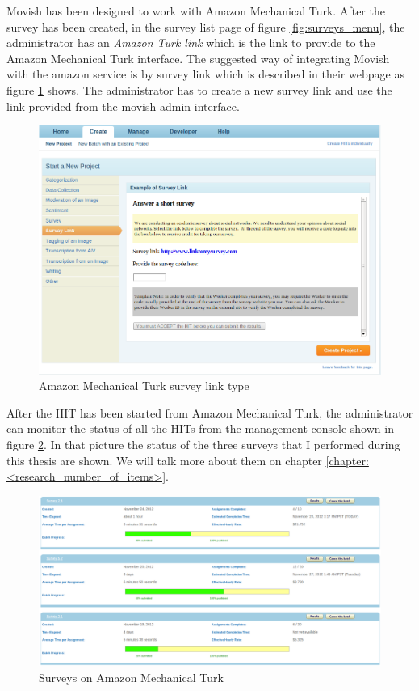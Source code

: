 Movish has been designed to work with Amazon Mechanical Turk. After the survey has been created, in the survey list page of figure \ref{fig:surveys_menu}, the administrator has an \textit{Amazon Turk link} which is the link to provide to the Amazon Mechanical Turk interface. The suggested way of integrating Movish with the amazon service is by survey link which is described in their webpage as figure \ref{fig:amazon_turk_survey_link} shows. The administrator has to create a new survey link and use the link provided from the movish admin interface.

\begin{figure}
  \centering
  \includegraphics[width=\textwidth]{figures/amazon_turk_survey_link.png}
  \caption{Amazon Mechanical Turk survey link type}
  \label{fig:amazon_turk_survey_link}
\end{figure}

After the HIT has been started from Amazon Mechanical Turk, the administrator can monitor the status of all the HITs from the management console shown in figure \ref{fig:surveys_on_turk}. In that picture the status of the three surveys that I performed during this thesis are shown. We will talk more about them on chapter \ref{chapter:<research_number_of_items>}.
 
\begin{figure}
  \centering
  \includegraphics[width=\textwidth]{figures/amazon_turk_surveys.png}
  \caption{Surveys on Amazon Mechanical Turk}
  \label{fig:surveys_on_turk}
\end{figure}

